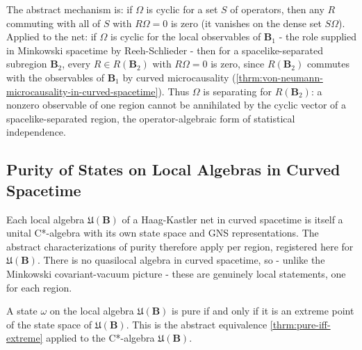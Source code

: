 \begin{theorem}
    \label{thrm:statistical-independence-in-curved-spacetime}
    \leanok
    The abstract mechanism is: if $\Omega$ is cyclic for a set $S$ of operators, then any $R$ commuting with all of $S$ with $R\Omega = 0$ is zero (it vanishes on the dense set $S\Omega$). Applied to the net: if $\Omega$ is cyclic for the local observables of $\mathbf{B}_1$ - the role supplied in Minkowski spacetime by Reeh-Schlieder - then for a spacelike-separated subregion $\mathbf{B}_2$, every $R \in R(\mathbf{B}_2)$ with $R\Omega = 0$ is zero, since $R(\mathbf{B}_2)$ commutes with the observables of $\mathbf{B}_1$ by curved microcausality (\ref{thrm:von-neumann-microcausality-in-curved-spacetime}). Thus $\Omega$ is separating for $R(\mathbf{B}_2)$: a nonzero observable of one region cannot be annihilated by the cyclic vector of a spacelike-separated region, the operator-algebraic form of statistical independence.
\end{theorem}

\subsection{Purity of States on Local Algebras in Curved Spacetime}

Each local algebra $\mathfrak{U}(\mathbf{B})$ of a Haag-Kastler net in curved spacetime is itself a unital C*-algebra with its own state space and GNS representations. The abstract characterizations of purity therefore apply per region, registered here for $\mathfrak{U}(\mathbf{B})$. There is no quasilocal algebra in curved spacetime, so - unlike the Minkowski covariant-vacuum picture - these are genuinely local statements, one for each region.

\begin{theorem}
    \label{thrm:pure-iff-extreme-in-curved-spacetime}
    \leanok
    A state $\omega$ on the local algebra $\mathfrak{U}(\mathbf{B})$ is pure if and only if it is an extreme point of the state space of $\mathfrak{U}(\mathbf{B})$. This is the abstract equivalence \ref{thrm:pure-iff-extreme} applied to the C*-algebra $\mathfrak{U}(\mathbf{B})$.
\end{theorem}

